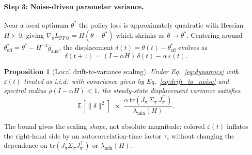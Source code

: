 \documentclass{article}
\theoremstyle{plain}
\newtheorem{proposition}[theorem]{Proposition}
\theoremstyle{definition}
\theoremstyle{remark}
\begin{document}
\paragraph{Step 3: Noise-driven parameter variance.}
Near a local optimum $\theta^*$ the policy loss is approximately
quadratic with Hessian $H \succ 0$, giving $\nabla_\theta
L_{\mathrm{PPO}} = H(\theta - \theta^*)$ which shrinks as $\theta \to
\theta^*$. Centering around $\theta^*_{\mathrm{eff}} = \theta^* -
H^{-1} \bar g_{\mathrm{aux}}$, the displacement $\delta(t) = \theta(t)
- \theta^*_{\mathrm{eff}}$ evolves as
\begin{equation}
    \delta(t{+}1) = (I - \alpha H)\,\delta(t) - \alpha\,\varepsilon(t).
    \label{eq:dynamics}
\end{equation}

\begin{proposition}[Local drift-to-variance scaling]
\label{prop:variance}
Under Eq.~\eqref{eq:dynamics} with $\varepsilon(t)$ treated as
i.i.d.\ with covariance given by Eq.~\eqref{eq:drift_to_noise} and
spectral radius $\rho(I - \alpha H) < 1$, the steady-state
displacement variance satisfies
\begin{equation}
    \mathbb{E}[\|\delta\|^2]
    \;\propto\;
    \frac{\alpha \,\mathrm{tr}(J_\pi \,\Sigma_\pi\, J_\pi^\top)}
         {\lambda_{\min}(H)}.
    \label{eq:variance_bound}
\end{equation}
\end{proposition}

The bound gives the scaling \emph{shape}, not absolute magnitude:
colored $\varepsilon(t)$ inflates the right-hand side by an
autocorrelation-time factor $\tau_c$ without changing the
dependence on $\mathrm{tr}(J_\pi \Sigma_\pi J_\pi^\top)$ or
$\lambda_{\min}(H)$.
\end{document}
